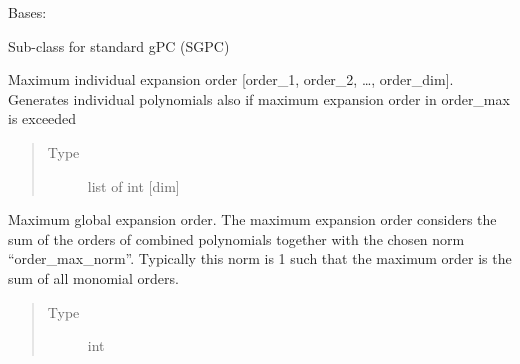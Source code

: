 \documentclass[letterpaper,10pt,english,openany,oneside]{sphinxmanual}
\begin{document}
\begin{fulllineitems}
\label{\detokenize{pygpc:pygpc.SGPC.SGPC}}
Bases: {\hyperref[\detokenize{pygpc:pygpc.GPC.GPC}]{}}

Sub-class for standard gPC (SGPC)

\begin{fulllineitems}
\label{\detokenize{pygpc:pygpc.SGPC.SGPC.order}}
Maximum individual expansion order {[}order\_1, order\_2, …, order\_dim{]}.
Generates individual polynomials also if maximum expansion order in order\_max is exceeded
\begin{quote}\begin{description}
\item[{Type}] \leavevmode
list of int {[}dim{]}

\end{description}\end{quote}

\end{fulllineitems}


\begin{fulllineitems}
\label{\detokenize{pygpc:pygpc.SGPC.SGPC.order_max}}
Maximum global expansion order.
The maximum expansion order considers the sum of the orders of combined polynomials together with the
chosen norm “order\_max\_norm”. Typically this norm is 1 such that the maximum order is the sum of all
monomial orders.
\begin{quote}\begin{description}
\item[{Type}] \leavevmode
int

\end{description}\end{quote}

\end{fulllineitems}



\end{fulllineitems}
\end{document}
